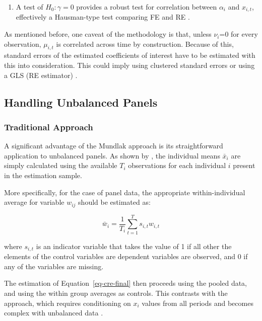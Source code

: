 \documentclass[bib]{statapress}
\providecommand{\tightlist}{%
  \setlength{\itemsep}{0pt}\setlength{\parskip}{0pt}}\usepackage{longtable,booktabs,array}
\begin{document}
\begin{enumerate}
\def\labelenumi{\arabic{enumi}.}
\setcounter{enumi}{2}
\tightlist
\item
  A test of \(H_0: \gamma = 0\) provides a robust test for correlation
  between \(\alpha_i\) and \(x_{i,t}\), effectively a Hausman-type test
  comparing FE and RE \citep[pg
  521,531]{wooldridge2010econometric, stata19}.
\end{enumerate}

As mentioned before, one caveat of the methodology is that, unless
\(\nu_i\)=0 for every observation, \(\mu_{i,t}\) is correlated across
time by construction. Because of this, standard errors of the estimated
coefficients of interest have to be estimated with this into
consideration. This could imply using clustered standard errors or using
a GLS (RE estimator) \citep[Chapter 10, pg
332]{wooldridge2010econometric}.

\subsection{Handling Unbalanced
Panels}\label{handling-unbalanced-panels}

\subsubsection{Traditional Approach}\label{traditional-approach}

A significant advantage of the Mundlak approach is its straightforward
application to unbalanced panels. As shown by
\citet{wooldridge2019introductory}, the individual means \(\bar x_i\)
are simply calculated using the available \(T_i\) observations for each
individual \(i\) present in the estimation sample.

More specifically, for the case of panel data, the appropriate
within-individual average for variable \(w_{ij}\) should be estimated
as:

\[\bar w_i = \frac{1}{T_i} \sum_{t=1}^T s_{i,t}w_{i,t}\]

where \(s_{i,t}\) is an indicator variable that takes the value of 1 if
all other the elements of the control variables are dependent variables
are observed, and 0 if any of the variables are missing.

The estimation of Equation~\ref{eq-cre-final} then proceeds using the
pooled data, and using the within group averages as controls. This
contrasts with the \citet{chamberlain1982multivariate} approach, which
requires conditioning on \(x_i\) values from all periods and becomes
complex with unbalanced data \citep{abrevaya2013}.
\end{document}
